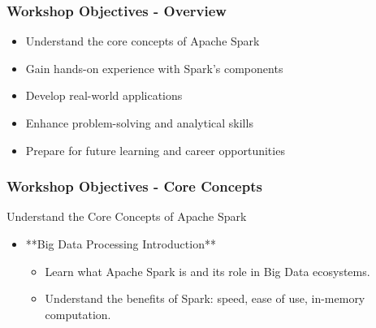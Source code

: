 \documentclass[aspectratio=169]{beamer}
\begin{document}
\begin{frame}[fragile]
    \frametitle{Workshop Objectives - Overview}
    \begin{itemize}
        \item Understand the core concepts of Apache Spark
        \item Gain hands-on experience with Spark's components
        \item Develop real-world applications
        \item Enhance problem-solving and analytical skills
        \item Prepare for future learning and career opportunities
    \end{itemize}
\end{frame}

\begin{frame}[fragile]
    \frametitle{Workshop Objectives - Core Concepts}
    \begin{block}{Understand the Core Concepts of Apache Spark}
        \begin{itemize}
            \item **Big Data Processing Introduction**
                \begin{itemize}
                    \item Learn what Apache Spark is and its role in Big Data ecosystems.
                    \item Understand the benefits of Spark: speed, ease of use, in-memory computation.
                \end{itemize}
        \end{itemize}
    \end{block}
\end{frame}
\end{document}
